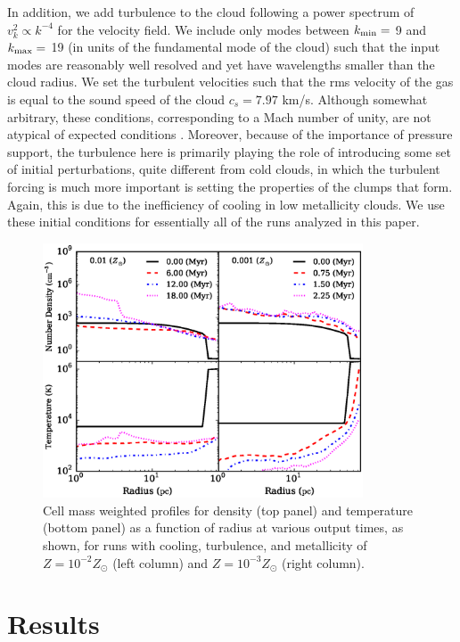 \documentclass[useAMS,usenatbib]{mn2e}
\begin{document}
In addition, we add turbulence to the cloud following a power spectrum of
$v_k^2 \propto k^{-4}$ for the velocity field.  We include only modes between
$k_{\rm min}=$ 9 and $k_{\rm max} =$ 19 (in units of the fundamental mode of
the cloud) such that the input modes are reasonably well resolved
and yet have wavelengths smaller than the cloud radius.  We set the turbulent velocities
such that the rms velocity of the gas is equal to the sound speed of the cloud $c_s = 7.97$ km/s.
Although somewhat arbitrary, these conditions, corresponding to a Mach number
of unity, are not atypical of expected conditions \citep{Li2015}.  Moreover, because of
the importance of pressure support, the turbulence here is primarily playing the role
of introducing some set of initial perturbations, quite different from cold clouds, 
in which the turbulent forcing is much more important is setting
the properties of the clumps that form.  Again, this is due to the inefficiency of cooling
in low metallicity clouds.
We use these initial conditions for essentially all of the runs analyzed in this paper.


% 


\begin{figure}
\begin{center}
\includegraphics[width=9.5cm]{Images/profile_panel}
\end{center}
\caption{\label{fig:profiles} Cell mass weighted profiles for 
density (top panel) and temperature (bottom panel) as a function of radius at various 
output times, as shown, for runs with cooling, turbulence, and metallicity of $Z=10^{-2}Z_\odot$
(left column) and $Z=10^{-3}Z_\odot$ (right column).}
\end{figure}

\section{Results}
\label{sec:results}
\end{document}
